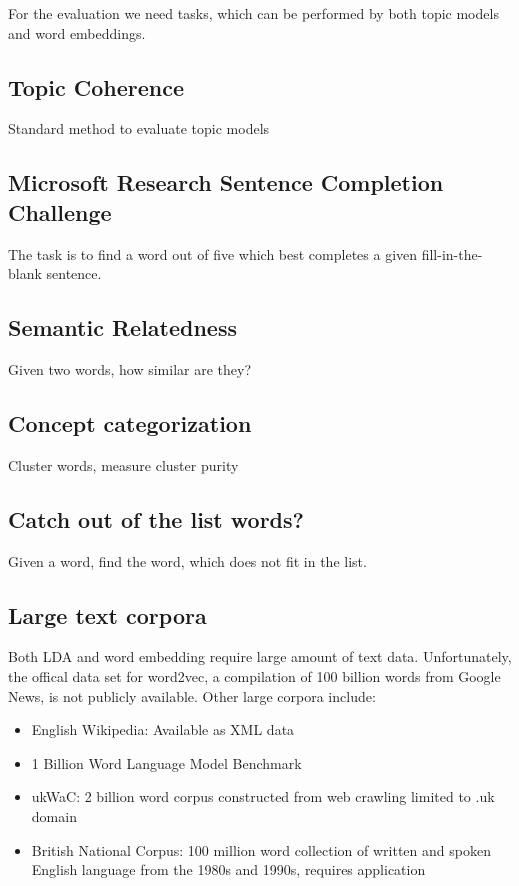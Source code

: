 \documentclass{sig-alternate-05-2015}
\begin{document}
For the evaluation we need tasks, which can be performed by both topic models and word embeddings.

\subsection{Topic Coherence}
Standard method to evaluate topic models
\subsection{Microsoft Research Sentence Completion Challenge}
The task is to find a word out of five which best completes a given fill-in-the-blank sentence.
\subsection{Semantic Relatedness}
Given two words, how similar are they?
\subsection{Concept categorization}
Cluster words, measure cluster purity

\subsection{Catch out of the list words?}
Given a word, find the word, which does not fit in the list.  %
\subsection{Large text corpora}
Both LDA and word embedding require large amount of text data.
Unfortunately, the offical data set for word2vec, a compilation of 100 billion words from Google News, is not publicly available.
Other large corpora include:
\begin{itemize}
       \item
              English Wikipedia: Available as XML data
       \item
              1 Billion Word Language Model Benchmark
       \item
              ukWaC: 2 billion word corpus constructed from web crawling limited to .uk domain
       \item
              British National Corpus: 100 million word collection of written and spoken English language from the 1980s and 1990s, requires application
\end{itemize}






\end{document}
